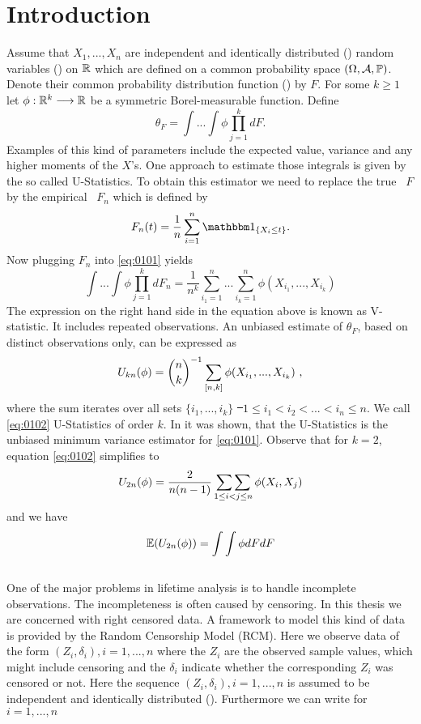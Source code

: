 \chapter{Introduction} \label{ch:introduction}
\label{sec:introduction}

Assume that $X_1,...,X_n$ are independent and identically distributed (\iid) random variables (\rv) on $\mathbb{R}$ which are defined on a common probability space $(\Omega, \mathcal{A}, \mathbb{P})$. Denote their common probability distribution function (\df) by $F$. For some $k\geq 1$ let $\phi: \mathbb{R}^k \longrightarrow \mathbb{R}$ be a symmetric Borel-measurable function. Define
\begin{equation}
\theta_F = \int ... \int \phi \prod\limits_{j=1}^k dF. 
\label{eq:0101}
\end{equation}
Examples of this kind of parameters include the expected value, variance and any higher moments of the $X$'s. One approach to estimate those integrals is given by the so called U-Statistics. To obtain this estimator we need to replace the true \df\ $F$ by the empirical \df\ $F_n$ which is defined by
$$F_n(t) = \frac{1}{n}\sum\limits_{i=1}^n \I{X_i\leq t}.$$
Now plugging $F_n$ into \eqref{eq:0101} yields
$$\int ... \int \phi \prod\limits_{j=1}^k dF_n = \frac{1}{n^k}\sum\limits_{i_1=1}^n...\sum\limits_{i_k=1}^n \phi(X_{i_1},...,X_{i_k})$$
The expression on the right hand side in the equation above is known as V-statistic. It includes repeated observations. An unbiased estimate of $\theta_F$, based on distinct observations only, can be expressed as
\begin{equation}
U_{kn}(\phi) = {n \choose k}^{-1} \sum\limits_{[n,k]} \phi(X_{i_1},...,X_{i_k})\textrm{ ,}
\label{eq:0102}
\end{equation}
where the sum iterates over all sets $\{i_1,...,i_k\}$ \st\ $ 1\leq i_1 < i_2 < ... < i_n \leq n$. We call \eqref{eq:0102} U-Statistics of order $k$. In \cite{lee1990u} it was shown, that the U-Statistics is the unbiased minimum variance estimator for \eqref{eq:0101}. Observe that for $k=2$, equation \eqref{eq:0102} simplifies to
$$U_{2n}(\phi)=\frac{2}{n(n-1)}\mathop{\sum\sum}\limits_{1\leq i<j \leq n}\phi(X_i,X_j)$$
and we have
$$\mathbb{E}(U_{2n}(\phi))=\int \int \phi dF dF$$
\\
One of the major problems in lifetime analysis is to handle incomplete observations. The incompleteness is often caused by censoring. In this thesis we are concerned with right censored data. A framework to model this kind of data is provided by the Random Censorship Model (RCM). Here we observe data of the form $(Z_i, \delta_i), i=1,...,n$ where the $Z_i$ are the observed sample values, which might include censoring and the $\delta_i$ indicate whether the corresponding $Z_i$ was censored or not. Here the sequence $(Z_i, \delta_i), i=1,...,n$ is assumed to be independent and identically distributed (\iid). Furthermore we can write for $i=1,...,n$
